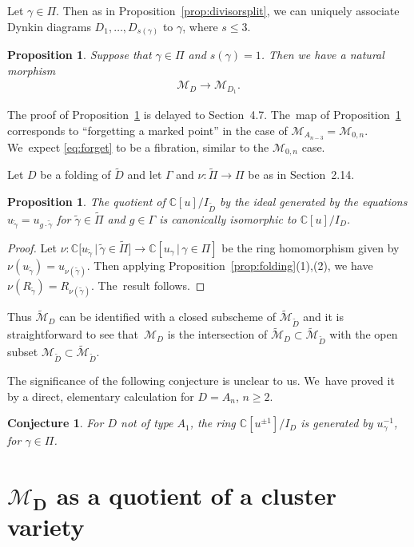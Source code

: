 \documentclass[pdftex]{sigma}%
\def\C{{\mathbb C}}
\def\M{{\mathcal{M}}}
\def\tM{{\widetilde {\mathcal{M}}}}
\def\tD{{\tilde D}}
\def\tgamma{{\tilde \gamma}}
\def\tPi{{\tilde \Pi}}
\numberwithin{equation}{section}
\newtheorem{Proposition}[Theorem]{Proposition}
\newtheorem{Conjecture}[Theorem]{Conjecture}
 { \theoremstyle{definition}
\newtheorem{Definition}[Theorem]{Definition}
\newtheorem{Example}[Theorem]{Example}
\newtheorem{Remark}[Theorem]{Remark}
\newtheorem{question}[Theorem]{Question}
\newtheorem{problem}[Theorem]{Problem}}
\begin{document}
\bigskip{}
Let $\gamma \in \Pi$. Then as in Proposition~\ref{prop:divisorsplit}, we can uniquely associate Dynkin diagrams $D_1,\dots,D_{s(\gamma)}$ to $\gamma$, where $s \leq 3$.

\begin{Proposition}\label{prop:forget}
Suppose that $\gamma \in \Pi$ and $s(\gamma) = 1$. Then we have a natural morphism
\begin{gather}\label{eq:forget}
\M_{D} \longrightarrow \M_{D_1}.
\end{gather}
\end{Proposition}
The proof of Proposition~\ref{prop:forget} is delayed to Section~4.7. The~map of Proposition~\ref{prop:forget} corresponds to ``forgetting a marked point'' in the case of $\M_{A_{n-3}} = \M_{0,n}$. We~expect \eqref{eq:forget} to be a fibration, similar to the $\M_{0,n}$ case.

\bigskip{}
Let $D$ be a folding of $\tD$ and let $\Gamma$ and $\nu\colon \tPi \to \Pi$ be as in Section~2.14.

\begin{Proposition}
The quotient of $\C[u]/I_{\tD}$ by the ideal generated by the equations $u_{\tgamma} = u_{g \cdot \tgamma}$ for $\tgamma \in \tPi$ and $g \in \Gamma$ is canonically isomorphic to $\C[u]/I_D$.
\end{Proposition}
\begin{proof}
Let $\nu\colon \C\big[u_{\tgamma}\,|\, \tgamma \in \tPi\big] \to \C[u_{\gamma}\,|\, \gamma \in \Pi]$ be the ring homomorphism given by $\nu(u_{\tgamma}) \allowbreak = u_{\nu(\tgamma)}$. Then applying Proposition~\ref{prop:folding}(1),(2), we have $\nu(R_{\tgamma}) = R_{\nu(\tgamma)}$. The~result follows.
\end{proof}
Thus $\tM_{D}$ can be identified with a closed subscheme of $\tM_{\tD}$ and it is straightforward to see that~$\M_{D}$ is the intersection of $\tM_{D} \subset \tM_{\tD}$ with the open subset $\M_{\tD} \subset \tM_{\tD}$.

\bigskip{}
The significance of the following conjecture is unclear to us. We~have proved it by a direct, elementary calculation for $D= A_n$, $n \geq 2$.
\begin{Conjecture}
For $D$ not of type $A_1$, the ring $\C[u^{\pm 1}]/I_D$ is generated by $u_\gamma^{-1}$, for $\gamma \in \Pi$.
\end{Conjecture}

\section[MD as a quotient of a cluster variety]
{$\boldsymbol{\M_D}$ as a quotient of a cluster variety}\label{sec:quotient}
\end{document}
